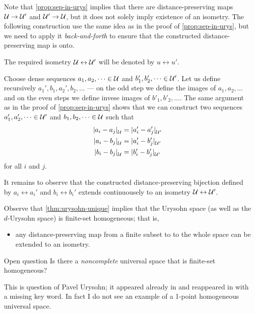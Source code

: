 Note that \ref{prop:sep-in-urys} implies that there are distance-preserving maps $\mathcal{U}\to \mathcal{U}'$ and $\mathcal{U}'\to \mathcal{U}$,
but it does not solely imply existence of an isometry.
The following construction use the same idea as in the proof of \ref{prop:sep-in-urys}, but we need to apply it {}\emph{back-and-forth} to ensure that the constructed distance-preserving map is onto.

The required isometry $\mathcal{U}\leftrightarrow \mathcal{U}'$ will be denoted by $u \leftrightarrow u'$.

Choose dense sequences $a_1,a_2,\dots\in \mathcal{U}$ and $b'_1,b'_2,\dots\in \mathcal{U}'$.
Let us define recursively $a_1',b_1, a_2', b_2,\dots$ --- on the odd step we define the images of $a_1,a_2,\dots$ and on the even steps we define invese images of $b'_1,b'_2,\dots$.
The same argument as in the proof of \ref{prop:sep-in-urys} shows that we can construct two sequences $a_1',a_2',\dots\in \mathcal{U}'$ and $b_1,b_2,\dots\in \mathcal{U}$ such that
\begin{align*}
\dist{a_i}{a_j}{\spc{U}}&=\dist{a_i'}{a_j'}{\spc{U}'}
\\
\dist{a_i}{b_j}{\spc{U}}&=\dist{a_i'}{b_j'}{\spc{U}'}
\\
\dist{b_i}{b_j}{\spc{U}}&=\dist{b_i'}{b_j'}{\spc{U}'}
\end{align*}
for all $i$ and $j$.

It remains to observe that the constructed distance-preserving bijection defined by $a_i\leftrightarrow a_i'$ and $b_i\leftrightarrow b_i'$ extends
continuousely to an isometry $\mathcal{U}\leftrightarrow \mathcal{U}'$. 
\qeds

Observe that \ref{thm:urysohn-unique} implies that the Urysohn space (as well as the $d$-Urysohn space) is finite-set homogeneous; that is,
\begin{itemize}
 \item any distance-preserving map from a finite subset to to the whole space can be extended to an isometry.
\end{itemize}

\begin{thm}{Open question}
Is there a {}\emph{noncomplete} universal space that is finite-set homogeneous?
\end{thm}

This is question of Pavel Urysohn; it appeared already in \cite[\S2(6)]{urysohn} and reappeared in \cite[p. 83]{gromov-2007} with a missing key word.
In fact I do not see an example of a 1-point homogeneous universal space.

